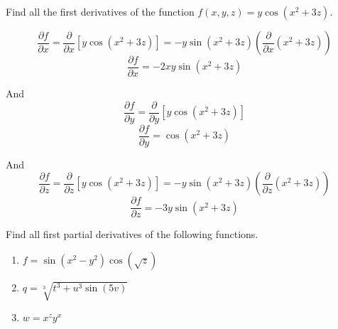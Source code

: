 \begin{Worked}
\begin{Problem}
Find all the first derivatives of the function $f(x, y, z) = 
y\cos{ \left(x^2 + 3z \right)}$. 
\end{Problem}
\begin{Solution}
$$\frac{\partial f}{\partial x} = \frac{\partial}{\partial x} \left[ y \cos{ 
\left(x^2 + 3z \right)} \right] = -y\sin{\left(x^2 + 3z \right)} \left( \frac{
\partial}{\partial x} \left( x^2 + 3z \right) \right)$$
$$\frac{\partial f}{\partial x} = -2xy \sin{ \left( x^2 + 3z \right)}$$

And
$$\frac{\partial f}{\partial y} = \frac{\partial}{\partial y} \left[ y\cos{ 
\left(x^2 + 3z \right)} \right]$$
$$\frac{\partial f}{\partial y} = \cos{ \left(x^2 + 3z \right)}$$

And
$$\frac{\partial f}{\partial z} = \frac{\partial}{\partial z} \left[ y \cos{ 
\left(x^2 + 3z \right)} \right] = -y\sin{ \left(x^2 + 3z \right)} \left( \frac{
\partial}{\partial z} \left( x^2 + 3z \right) \right)$$
$$\frac{\partial f}{\partial z} = -3y \sin{ \left(x^2 + 3z \right)}$$
\end{Solution}
\end{Worked}

\begin{Exercise}[title = {Partial Derivatives with 3 or More Variables}, 
label = three]
Find all first partial derivatives of the following functions.
\begin{enumerate}
\item $f = \sin{\left( x^2 - y^2 \right)} \cos{\left( \sqrt{z} \right)}$
\item $q = \sqrt[3]{t^3 + u^3\sin{\left(5v \right)}}$
\item $w = x^z y^x$
\end{enumerate}
\end{Exercise}

